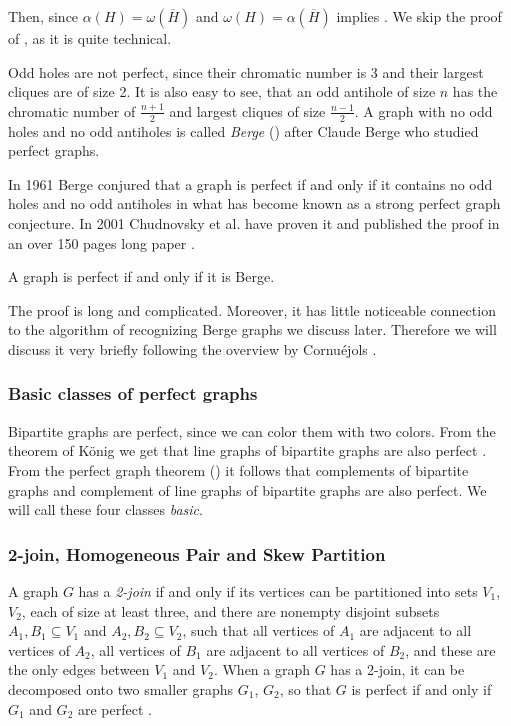 
Then, since $\alpha(H) = \omega(\overline{H})$ and $\omega(H) = \alpha(\overline{H})$  implies . We skip the proof of , as it is quite technical.

Odd holes are not perfect, since their chromatic number is 3 and their largest cliques are of size 2. It is also easy to see, that an odd antihole of size $n$ has the chromatic number of $\frac{n+1}{2}$ and largest cliques of size $\frac{n-1}{2}$. A graph with no odd holes and no odd antiholes is called \emph{Berge} () after Claude Berge who studied perfect graphs.

In 1961 Berge conjured that a graph is perfect if and only if it contains no odd holes and no odd antiholes in what has become known as a strong perfect graph conjecture. In 2001 Chudnovsky et al. have proven it and published the proof in an over 150 pages long paper  \cite{MC06}.

\begin{theorem}
	\label{thm:spgt}
	A graph is perfect if and only if it is Berge.
\end{theorem}

The proof is long and complicated. Moreover, it has little noticeable connection to the algorithm of recognizing Berge graphs we discuss later. Therefore we will discuss it very briefly following the overview by Cornuéjols \cite{GC03}.

\subsubsection{Basic classes of perfect graphs}
Bipartite graphs are perfect, since we can color them with two colors. From the theorem of König \cite{Knig1916} we get that line graphs of bipartite graphs are also perfect \cite{GC03}. From the perfect graph theorem () it follows that complements of bipartite graphs and complement of line graphs of bipartite graphs are also perfect. We will call these four classes \emph{basic}.

\subsubsection{2-join, Homogeneous Pair and Skew Partition}
A graph $G$ has a \emph{2-join} if and only if its vertices can be partitioned into sets $V_1$, $V_2$, each of size at least three, and there are nonempty disjoint subsets $A_1, B_1 \subseteq V_1$ and $A_2, B_2 \subseteq V_2$, such that all vertices of $A_1$ are adjacent to all vertices of $A_2$, all vertices of $B_1$ are adjacent to all vertices of $B_2$, and these are the only edges between $V_1$ and $V_2$. When a graph $G$ has a 2-join, it can be decomposed onto two smaller graphs $G_1$, $G_2$, so that $G$ is perfect if and only if $G_1$ and $G_2$ are perfect \cite{Cornujols1985}.

